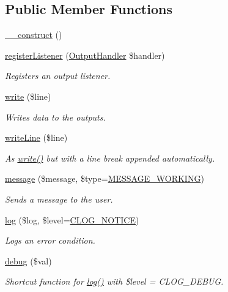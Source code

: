 \subsection*{Public Member Functions}
\begin{DoxyCompactItemize}
\item 
\hyperlink{classOutputManager_a132ba83d52ad9c215db71e10e230ed85}{\-\_\-\-\_\-construct} ()
\item 
\hyperlink{classOutputManager_a7e001734d74245f64a31ce2b0061b627}{register\-Listener} (\hyperlink{interfaceOutputHandler}{Output\-Handler} \$handler)
\begin{DoxyCompactList}\small\item\em Registers an output listener. \end{DoxyCompactList}\item 
\hyperlink{classOutputManager_a3405bdd3e4710b3f396f18df0271fd06}{write} (\$line)
\begin{DoxyCompactList}\small\item\em Writes data to the outputs. \end{DoxyCompactList}\item 
\hyperlink{classOutputManager_a06926e4738628f1fa9c715695b5972e1}{write\-Line} (\$line)
\begin{DoxyCompactList}\small\item\em As \hyperlink{classOutputManager_a3405bdd3e4710b3f396f18df0271fd06}{write()} but with a line break appended automatically. \end{DoxyCompactList}\item 
\hyperlink{classOutputManager_afa5ea784d0f13cb12c2683e469c29861}{message} (\$message, \$type=\hyperlink{Messenger_8iface_a42a959808a10ab30584347844a7d1657}{M\-E\-S\-S\-A\-G\-E\-\_\-\-W\-O\-R\-K\-I\-N\-G})
\begin{DoxyCompactList}\small\item\em Sends a message to the user. \end{DoxyCompactList}\item 
\hyperlink{classOutputManager_a3fe77819e4b74f2e3d88b657540ad27b}{log} (\$log, \$level=\hyperlink{group__log__levels_ga8fe5fb4d67cefbcc5556321a2a1ffaec}{C\-L\-O\-G\-\_\-\-N\-O\-T\-I\-C\-E})
\begin{DoxyCompactList}\small\item\em Logs an error condition. \end{DoxyCompactList}\item 
\hyperlink{classOutputManager_ad9afb08b0b31862b33c426e58f4f063e}{debug} (\$val)
\begin{DoxyCompactList}\small\item\em Shortcut function for \hyperlink{classOutputManager_a3fe77819e4b74f2e3d88b657540ad27b}{log()} with \$level = C\-L\-O\-G\-\_\-\-D\-E\-B\-U\-G. \end{DoxyCompactList}\end{DoxyCompactItemize}
